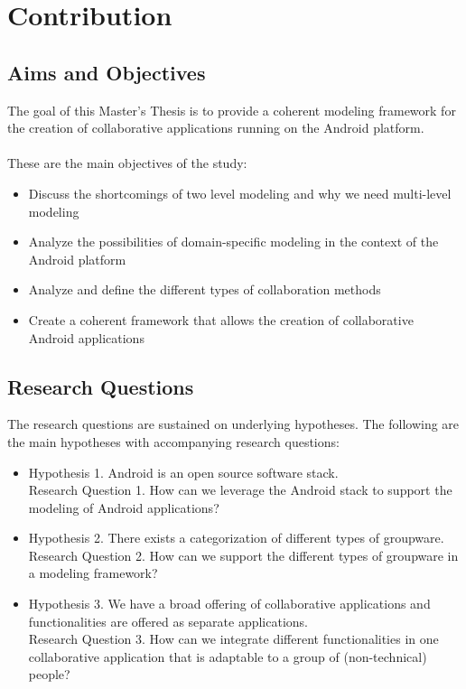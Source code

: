 \section{Contribution}

\subsection{Aims and Objectives}

The goal of this Master's Thesis is to provide a coherent modeling framework for the creation of collaborative applications running on the Android platform. 
\\ \\
These are the main objectives of the study:

\begin{itemize}
\item{Discuss the shortcomings of two level modeling and why we need multi-level modeling}
\item{Analyze the possibilities of domain-specific modeling in the context of the Android platform}
\item{Analyze and define the different types of collaboration methods}
\item{Create a coherent framework that allows the creation of collaborative Android applications}
\end{itemize}

\subsection{Research Questions}

The research questions are sustained on underlying hypotheses. The following are the main hypotheses with accompanying research questions:

\begin{itemize}
\item{Hypothesis 1. Android is an open source software stack. \\
Research Question 1. How can we leverage the Android stack to support the modeling of Android applications?}
\item{Hypothesis 2. There exists a categorization of different types of groupware. \\
Research Question 2. How can we support the different types of groupware in a modeling framework?}
\item{Hypothesis 3. We have a broad offering of collaborative applications and functionalities are offered as separate applications. \\
Research Question 3. How can we integrate different functionalities in one collaborative application that is adaptable to a group of (non-technical) people?}
\end{itemize}

